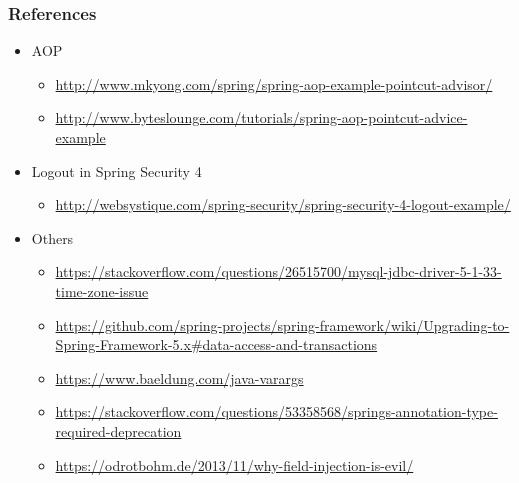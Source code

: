 \documentclass[10pt,xcolor=pdflatex, table]{beamer}
\begin{document}
\begin{frame}\frametitle{References}
	\begin{itemize}
	    \item AOP
          \begin{itemize}
            \item \url{http://www.mkyong.com/spring/spring-aop-example-pointcut-advisor/}
            \item \url{http://www.byteslounge.com/tutorials/spring-aop-pointcut-advice-example}
          \end{itemize}
		\item Logout in Spring Security 4
          \begin{itemize}
        	\item \url{http://websystique.com/spring-security/spring-security-4-logout-example/}
          \end{itemize}
        \item Others
          \begin{itemize}
              \item \url{https://stackoverflow.com/questions/26515700/mysql-jdbc-driver-5-1-33-time-zone-issue}
              \item \url{https://github.com/spring-projects/spring-framework/wiki/Upgrading-to-Spring-Framework-5.x\#data-access-and-transactions}
              \item \url{https://www.baeldung.com/java-varargs}
              \item \url{https://stackoverflow.com/questions/53358568/springs-annotation-type-required-deprecation}
              \item \url{https://odrotbohm.de/2013/11/why-field-injection-is-evil/}
          \end{itemize}
	\end{itemize}
\end{frame}

\end{document}

